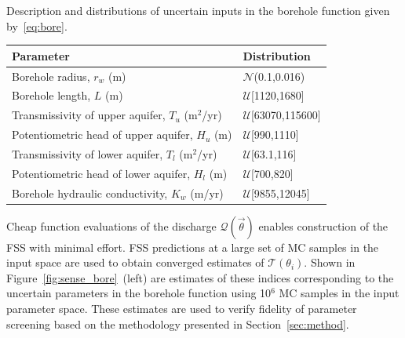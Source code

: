 \begin{table}[ht]
\renewcommand*{\arraystretch}{1.2}
\caption{Description and distributions of uncertain inputs in the borehole function
given by~\eqref{eq:bore}.}
\label{tab:bore}
\end{table}
\begin{center}
\begin{tabular}{ll}
\toprule
\textbf{Parameter} & \textbf{Distribution} \\ 
\bottomrule
Borehole radius, $r_w$ (m) & $\mathcal{N}$(0.1,0.016) \\
Borehole length, $L$ (m) & $\mathcal{U}$[1120,1680] \\
Transmissivity of upper aquifer, $T_u$ (m$^2$/yr) & $\mathcal{U}$[63070,115600] \\
Potentiometric head of upper aquifer, $H_u$ (m) & $\mathcal{U}$[990,1110] \\
Transmissivity of lower aquifer, $T_l$ (m$^2$/yr) & $\mathcal{U}$[63.1,116] \\
Potentiometric head of lower aquifer, $H_l$ (m) & $\mathcal{U}$[700,820] \\
Borehole hydraulic conductivity, $K_w$ (m/yr) & $\mathcal{U}$[9855,12045] \\
\bottomrule
\end{tabular}
\end{center}

%
Cheap function evaluations of the discharge $\mathcal{Q}(\vec{\theta})$ 
enables construction of the FSS with minimal effort. FSS predictions at
a large set of MC samples in the input space are used to obtain converged
estimates of $\mathcal{T}(\theta_i)$. Shown in
Figure~\ref{fig:sense_bore}~(left) are estimates of these indices corresponding to the
uncertain parameters in the borehole function using 10$^6$ MC
samples in the input parameter space. 
These estimates are used to verify fidelity of
parameter screening based on the methodology presented in Section~\ref{sec:method}. 

